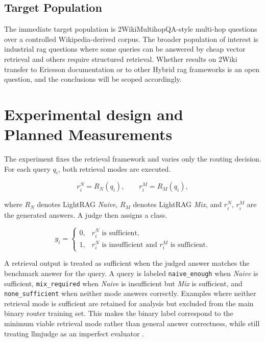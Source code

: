 \documentclass[english, bibtex]{kththesis}               %
\numberwithin{listing}{chapter}
\begin{document}
\subsection{Target Population}

The immediate target population is 2WikiMultihopQA-style multi-hop questions over a controlled Wikipedia-derived corpus. The broader population of interest is industrial \gls{rag} questions where some queries can be answered by cheap vector retrieval and others require structured retrieval. Whether results on 2Wiki transfer to Ericsson documentation or to other Hybrid \gls{rag} frameworks is an open question, and the conclusions will be scoped accordingly.

\section[Experimental design/Planned Measurements]{Experimental design and\\Planned Measurements}
\label{sec:experimentalDesign}

The experiment fixes the retrieval framework and varies only the routing decision. For each query \(q_i\), both retrieval modes are executed.

\begin{equation}
\label{eq:dualModeOutputs}
r_i^{N} = R_N(q_i),
\qquad
r_i^{M} = R_M(q_i),
\end{equation}

where \(R_N\) denotes LightRAG \emph{Naive}, \(R_M\) denotes LightRAG \emph{Mix}, and \(r_i^N\), \(r_i^M\) are the generated answers. A judge then assigns a class.

\begin{equation}
\label{eq:routingLabel}
y_i =
\begin{cases}
0, & r_i^N \text{ is sufficient},\\
1, & r_i^N \text{ is insufficient and } r_i^M \text{ is sufficient}.
\end{cases}
\end{equation}

A retrieval output is treated as sufficient when the judged answer matches the benchmark answer for the query. A query is labeled \texttt{naive\_enough} when \emph{Naive} is sufficient, \texttt{mix\_required} when \emph{Naive} is insufficient but \emph{Mix} is sufficient, and \texttt{none\_sufficient} when neither mode answers correctly. Examples where neither retrieval mode is sufficient are retained for analysis but excluded from the main binary router training set. This makes the binary label correspond to the minimum viable retrieval mode rather than general answer correctness, while still treating \gls{llmjudge} as an imperfect evaluator \cite{zheng2023judge}.
\end{document}
